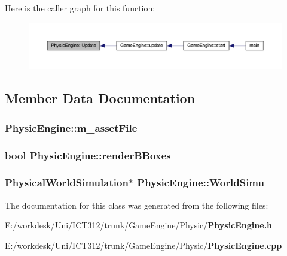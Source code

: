 Here is the caller graph for this function\+:\nopagebreak
\begin{figure}[H]
\begin{center}
\leavevmode
\includegraphics[width=350pt]{d5/d43/class_physic_engine_a3c7bea94f54bb18cbd7b403a1332667f_icgraph}
\end{center}
\end{figure}




\subsection{Member Data Documentation}
\subsubsection[{m\+\_\+asset\+File}]{ Physic\+Engine\+::m\+\_\+asset\+File\hspace{0.3cm}{\ttfamily [private]}}\label{class_physic_engine_ae5aa394fb7355a23a51cabff132508eb}
\subsubsection[{render\+B\+Boxes}]{\setlength{\rightskip}{0pt plus 5cm}bool Physic\+Engine\+::render\+B\+Boxes\hspace{0.3cm}{\ttfamily [private]}}\label{class_physic_engine_a3948c0b23b95b721fdd8a28b18d8fb87}
\subsubsection[{World\+Simu}]{\setlength{\rightskip}{0pt plus 5cm}Physical\+World\+Simulation$\ast$ Physic\+Engine\+::\+World\+Simu}\label{class_physic_engine_a4540cdf29a4dab6adf029ebae89e108f}


The documentation for this class was generated from the following files\+:\begin{DoxyCompactItemize}
\item 
E\+:/workdesk/\+Uni/\+I\+C\+T312/trunk/\+Game\+Engine/\+Physic/{\bf Physic\+Engine.\+h}\item 
E\+:/workdesk/\+Uni/\+I\+C\+T312/trunk/\+Game\+Engine/\+Physic/{\bf Physic\+Engine.\+cpp}\end{DoxyCompactItemize}
